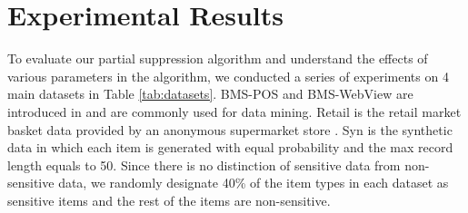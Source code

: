
\section{Experimental Results}
\label{sec:eval}

To evaluate our partial suppression algorithm and understand the effects of
various parameters in the algorithm, we conducted a series of experiments on
4 main datasets in Table \ref{tab:datasets}. BMS-POS and BMS-WebView are
introduced in \cite{Zheng:2001:RWP:502512.502572} and are commonly used for
data mining. Retail is the retail market basket data provided by an anonymous
supermarket store \cite{brijs99:retailData}. Syn is the synthetic data in
which each item is generated with equal probability and the max record length
equals to 50.
 Since there is no distinction of sensitive data from non-sensitive data,
 we randomly designate 40\% of the item types in each dataset as
sensitive items and the rest of the items are non-sensitive.


